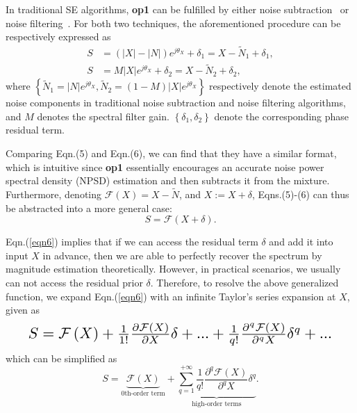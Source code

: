 \documentclass{article}
\begin{document}
In traditional SE algorithms, \textbf{op1} can be fulfilled by either noise subtraction~{\cite{boll1979suppression}} or noise filtering~{\cite{ephraim1984speech}}. For both two techniques, the aforementioned procedure can be respectively expressed as
\begin{align}
\label{eqn4}
S &= \left(\left|X\right| - \left|N\right|\right)e^{j\theta_{X}} + \delta_{1} = X - \widetilde{N}_{1} + \delta_{1},\\
S &= M\left|X\right|e^{j\theta_{X}} + \delta_{2} = X - \widetilde{N}_{2} + \delta_{2},
\end{align}
where $\left\{\widetilde{N}_{1} = \left|N\right|e^{j\theta_{X}}, \widetilde{N}_{2} = (1 - M)\left|X\right|e^{j\theta_{X}}\right\}$ respectively denote the estimated noise components in traditional noise subtraction and noise filtering algorithms, and $M$ denotes the spectral filter gain. $\left\{\delta_{1}, \delta_{2}\right\}$ denote the corresponding phase residual term.

Comparing Eqn.(5) and Eqn.(6), we can find that they have a similar format, which is intuitive since \textbf{op1} essentially encourages an accurate noise power spectral density (NPSD) estimation and then subtracts it from the mixture. Furthermore, denoting $\mathcal{F}\left(X\right) = X - \widetilde{N}$, and $X:=X+\delta$, Eqns.(5)-(6) can thus be abstracted into a more general case:
\begin{equation}
\label{eqn6}
S = \mathcal{F}\left(X + \delta\right).
\end{equation}

Eqn.(\ref{eqn6}) implies that if we can access the residual term $\delta$ and add it into input $X$ in advance, then we are able to perfectly recover the spectrum by magnitude estimation theoretically. However, in practical scenarios, we usually can not access the residual prior $\delta$. Therefore, to resolve the above generalized function, we expand Eqn.(\ref{eqn6}) with an infinite Taylor's series expansion at $X$, given as
\begin{align}
\label{eqn7}
\resizebox{0.91\linewidth}{!}{$
S = \mathcal{F} \left(X\right) + \frac{1}{1!}\frac{\partial\mathcal{F}\left(X\right)}{\partial X}\delta+...+ \frac{1}{q!}\frac{\partial^{q}\mathcal{F}\left(X\right)}{\partial^{q}X}\delta^{q}+...
$}
\end{align}
which can be simplified as
\begin{equation}
\label{eqn8}
S = \underbrace{\mathcal{F}\left(X\right)}_{\text{0th-order term}} + \underbrace{\sum_{q=1}^{+\infty}\frac{1}{q!}\frac{\partial^{q}\mathcal{F}\left(X\right)}{\partial^{q} X}\delta^{q}}_{\text{high-order terms}}.
\end{equation}
\end{document}
